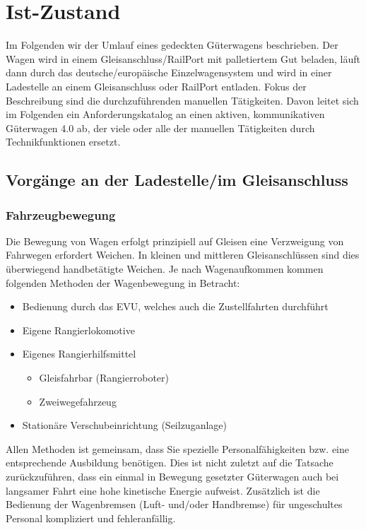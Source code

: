 \section{Ist-Zustand}
Im Folgenden wir der Umlauf eines gedeckten Güterwagens beschrieben. Der Wagen wird in einem Gleisanschluss/RailPort mit palletiertem Gut beladen, läuft dann durch das deutsche/europäische Einzelwagensystem und wird in einer Ladestelle an einem Gleisanschluss oder RailPort entladen. Fokus der Beschreibung sind die durchzuführenden manuellen Tätigkeiten. Davon leitet sich im Folgenden ein Anforderungskatalog an einen aktiven, kommunikativen Güterwagen 4.0 ab, der viele oder alle der manuellen Tätigkeiten durch Technikfunktionen ersetzt.

\subsection{Vorgänge an der Ladestelle/im Gleisanschluss}
\subsubsection{Fahrzeugbewegung}
Die Bewegung von Wagen erfolgt prinzipiell auf Gleisen eine Verzweigung von Fahrwegen erfordert Weichen. In kleinen und mittleren Gleisanschlüssen sind dies überwiegend handbetätigte Weichen. Je nach Wagenaufkommen kommen folgenden Methoden der Wagenbewegung in Betracht:
\begin{itemize}
	\item Bedienung durch das EVU, welches auch die Zustellfahrten durchführt
	\item Eigene Rangierlokomotive
	\item Eigenes Rangierhilfsmittel
	\begin{itemize}
	    \item Gleisfahrbar (Rangierroboter)
	    \item Zweiwegefahrzeug
	\end{itemize}
	\item Stationäre Verschubeinrichtung (Seilzuganlage)
\end{itemize}
Allen Methoden ist gemeinsam, dass Sie spezielle Personalfähigkeiten bzw. eine entsprechende Ausbildung benötigen. Dies ist nicht zuletzt auf die Tatsache zurückzuführen, dass ein einmal in Bewegung gesetzter Güterwagen auch bei langsamer Fahrt eine hohe kinetische Energie aufweist. Zusätzlich ist die Bedienung der Wagenbremsen (Luft- und/oder Handbremse) für ungeschultes Personal kompliziert und fehleranfällig.

